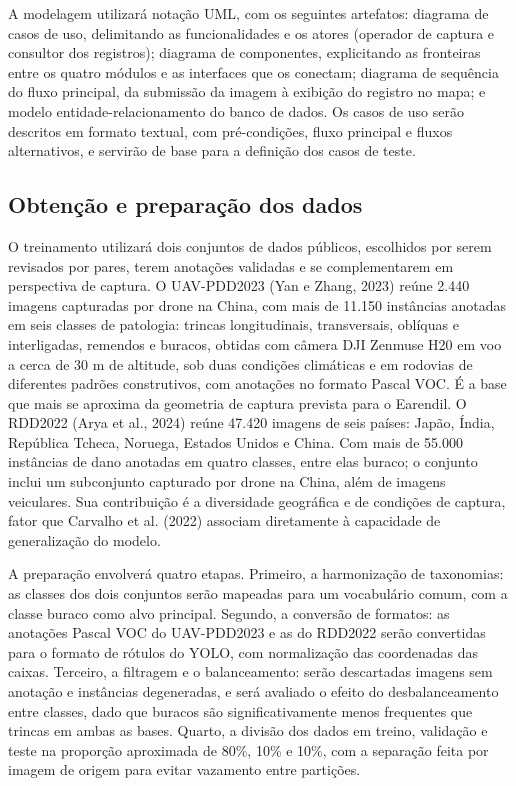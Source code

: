 \documentclass[12pt]{article}
\begin{document}
A modelagem utilizará notação UML, com os seguintes artefatos: diagrama
de casos de uso, delimitando as funcionalidades e os atores (operador de
captura e consultor dos registros); diagrama de componentes, explicitando
as fronteiras entre os quatro módulos e as interfaces que os conectam;
diagrama de sequência do fluxo principal, da submissão da imagem à
exibição do registro no mapa; e modelo entidade-relacionamento do banco
de dados. Os casos de uso serão descritos em formato textual, com
pré-condições, fluxo principal e fluxos alternativos, e servirão de base
para a definição dos casos de teste.

\subsection{Obtenção e preparação dos dados}
\label{sec:dados}

O treinamento utilizará dois conjuntos de dados públicos, escolhidos por
serem revisados por pares, terem anotações validadas e se complementarem
em perspectiva de captura. O UAV-PDD2023 (Yan e Zhang, 2023) reúne 2.440
imagens capturadas por drone na China, com mais de 11.150 instâncias
anotadas em seis classes de patologia: trincas longitudinais,
transversais, oblíquas e interligadas, remendos e buracos, obtidas com
câmera DJI Zenmuse H20 em voo a cerca de 30 m de altitude, sob duas
condições climáticas e em rodovias de diferentes padrões construtivos,
com anotações no formato Pascal VOC. É a base que mais se aproxima da
geometria de captura prevista para o Earendil. O RDD2022 (Arya et al.,
2024) reúne 47.420 imagens de seis países: Japão, Índia, República
Tcheca, Noruega, Estados Unidos e China. Com mais de 55.000 instâncias de
dano anotadas em quatro classes, entre elas buraco; o conjunto inclui um
subconjunto capturado por drone na China, além de imagens veiculares. Sua
contribuição é a diversidade geográfica e de condições de captura, fator
que Carvalho et al. (2022) associam diretamente à capacidade de
generalização do modelo.

A preparação envolverá quatro etapas. Primeiro, a harmonização de
taxonomias: as classes dos dois conjuntos serão mapeadas para um
vocabulário comum, com a classe buraco como alvo principal. Segundo, a
conversão de formatos: as anotações Pascal VOC do UAV-PDD2023 e as do
RDD2022 serão convertidas para o formato de rótulos do YOLO, com
normalização das coordenadas das caixas. Terceiro, a filtragem e o
balanceamento: serão descartadas imagens sem anotação e instâncias
degeneradas, e será avaliado o efeito do desbalanceamento entre classes,
dado que buracos são significativamente menos frequentes que trincas em
ambas as bases. Quarto, a divisão dos dados em treino, validação e teste
na proporção aproximada de 80\%, 10\% e 10\%, com a separação feita por
imagem de origem para evitar vazamento entre partições.
\end{document}
